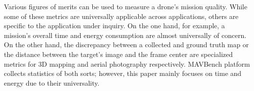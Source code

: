 Various figures of merits can be used to measure a drone's mission quality. While some of these metrics are universally applicable across applications, others are specific to the application under inquiry. On the one hand, for example, a mission's overall time and energy consumption are almost universally of concern. On the other hand, the discrepancy between a collected and ground truth map or the distance between the target's image and the frame center are specialized metrics for 3D mapping and aerial photography respectively. MAVBench platform collects statistics of both sorts; however, this paper mainly focuses on time and energy due to their universality. 

